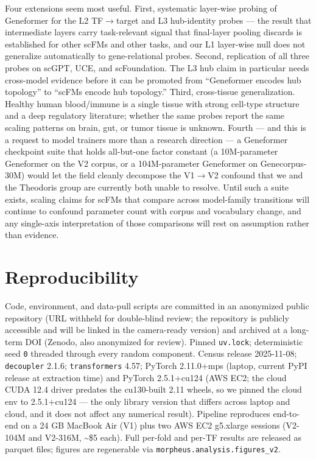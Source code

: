 \documentclass[10pt]{article}
\begin{document}
Four extensions seem most useful. First, systematic layer-wise probing
of Geneformer for the L2 TF$\to$target and L3 hub-identity probes --- the
\citet{civale2026} result that intermediate layers carry task-relevant
signal that final-layer pooling discards is established for other scFMs
and other tasks, and our L1 layer-wise null does not generalize
automatically to gene-relational probes. Second, replication of all
three probes on scGPT, UCE, and scFoundation. The L3 hub claim in
particular needs cross-model evidence before it can be promoted from
``Geneformer encodes hub topology'' to ``scFMs encode hub topology.''
Third, cross-tissue generalization. Healthy human blood/immune is a
single tissue with strong cell-type structure and a deep regulatory
literature; whether the same probes report the same scaling patterns on
brain, gut, or tumor tissue is unknown. Fourth --- and this is a request
to model trainers more than a research direction --- a Geneformer
checkpoint suite that holds all-but-one factor constant (a 10M-parameter
Geneformer on the V2 corpus, or a 104M-parameter Geneformer on
Genecorpus-30M) would let the field cleanly decompose the V1$\to$V2 confound
that we and the Theodoris group are currently both unable to resolve.
Until such a suite exists, scaling claims for scFMs that compare across
model-family transitions will continue to confound parameter count with
corpus and vocabulary change, and any single-axis interpretation of
those comparisons will rest on assumption rather than evidence.

\section{Reproducibility}\label{reproducibility}

Code, environment, and data-pull scripts are committed in an anonymized public repository (URL withheld for double-blind review; the repository is publicly accessible and will be linked in the camera-ready version) and archived at a long-term DOI (Zenodo, also anonymized for review). Pinned \texttt{uv.lock};
deterministic seed \texttt{0} threaded through every random component.
Census release 2025-11-08; \texttt{decoupler} 2.1.6;
\texttt{transformers} 4.57; PyTorch 2.11.0+mps (laptop, current PyPI
release at extraction time) and PyTorch 2.5.1+cu124 (AWS EC2; the cloud
CUDA 12.4 driver predates the cu130-built 2.11 wheels, so we pinned the
cloud env to 2.5.1+cu124 — the only library version that differs across
laptop and cloud, and it does not affect any numerical result). Pipeline reproduces end-to-end on a 24 GB MacBook Air (V1)
plus two AWS EC2 g5.xlarge sessions (V2-104M and V2-316M,
\textasciitilde\$5 each). Full per-fold and per-TF results are released
as parquet files; figures are regenerable via
\texttt{morpheus.analysis.figures\_v2}.
\end{document}

